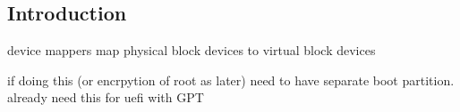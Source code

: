 
\subsection{Introduction}

device mappers map physical block devices to virtual block devices

if doing this (or encrpytion of root as later) need to have separate boot partition. already need this for uefi with GPT

